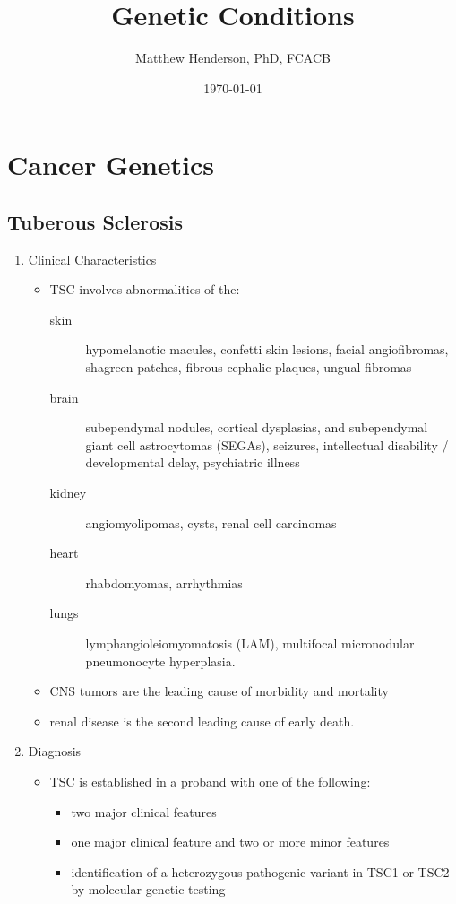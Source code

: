 \documentclass[12pt]{scrartcl}
\author{Matthew Henderson, PhD, FCACB}
\date{\today}
\title{Genetic Conditions}
\begin{document}
\maketitle
\setcounter{tocdepth}{2}
\tableofcontents


\section{Cancer Genetics}
\label{sec:orgf205287}
\subsection{Tuberous Sclerosis}
\label{sec:org5abc3ae}
\begin{enumerate}
\item Clinical Characteristics
\label{sec:org28affc5}
\begin{itemize}
\item TSC involves abnormalities of the:
\begin{description}
\item[{skin}] hypomelanotic macules, confetti skin lesions, facial
angiofibromas, shagreen patches, fibrous cephalic plaques,
ungual fibromas
\item[{brain}] subependymal nodules, cortical dysplasias, and
subependymal giant cell astrocytomas (SEGAs), seizures,
intellectual disability / developmental delay,
psychiatric illness
\item[{kidney}] angiomyolipomas, cysts, renal cell carcinomas
\item[{heart}] rhabdomyomas, arrhythmias
\item[{lungs}] lymphangioleiomyomatosis (LAM), multifocal micronodular
pneumonocyte hyperplasia.
\end{description}
\item CNS tumors are the leading cause of morbidity and mortality
\item renal disease is the second leading cause of early death.
\end{itemize}

\item Diagnosis
\label{sec:org74f19ec}
\begin{itemize}
\item TSC is established in a proband with one of the following:
\begin{itemize}
\item two major clinical features
\item one major clinical feature and two or more minor features
\item identification of a heterozygous pathogenic variant in TSC1 or
TSC2 by molecular genetic testing
\end{itemize}
\end{itemize}


\end{enumerate}
\end{document}
